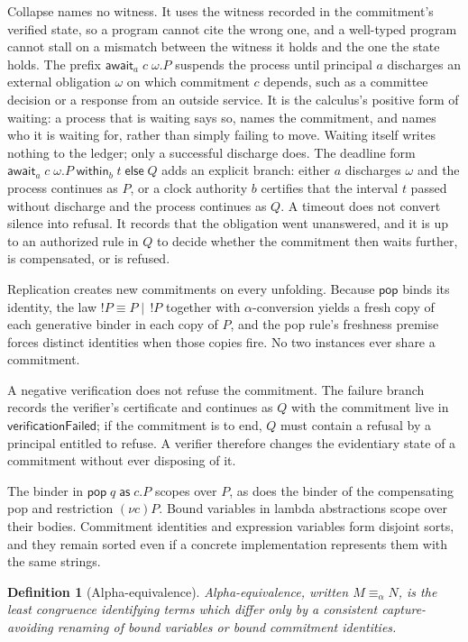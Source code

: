 \documentclass[11pt,openany]{book}
\newtheorem{definition}[theorem]{Definition}
\theoremstyle{remark}
\begin{document}
Collapse names no witness. It uses the witness recorded in the
commitment's verified state, so a program cannot cite the wrong one, and a
well-typed program cannot stall on a mismatch between the witness it holds
and the one the state holds. The prefix $\mathsf{await}_a\;c\;\omega.P$
suspends the process until principal $a$ discharges an external
obligation $\omega$ on which commitment $c$ depends, such as a committee
decision or a response from an outside service. It is the calculus's
positive form of waiting: a process that is waiting says so, names the
commitment, and names who it is waiting for, rather than simply failing to
move. Waiting itself writes nothing to the ledger; only a successful
discharge does. The deadline form
$\mathsf{await}_a\;c\;\omega.P\;\mathsf{within}_b\;t\;\mathsf{else}\;Q$
adds an explicit branch: either $a$ discharges $\omega$ and the process
continues as $P$, or a clock authority $b$ certifies that the interval $t$
passed without discharge and the process continues as $Q$. A timeout does
not convert silence into refusal. It records that the obligation went
unanswered, and it is up to an authorized rule in $Q$ to decide whether
the commitment then waits further, is compensated, or is refused.

Replication creates new commitments on every unfolding. Because
$\mathsf{pop}$ binds its identity, the law $!P\equiv P\mid\,!P$ together
with $\alpha$-conversion yields a fresh copy of each generative binder in
each copy of $P$, and the pop rule's freshness premise forces distinct
identities when those copies fire. No two instances ever share a
commitment.

A negative verification does not refuse the commitment. The failure
branch records the verifier's certificate and continues as $Q$ with the
commitment live in $\mathsf{verificationFailed}$; if the commitment is to
end, $Q$ must contain a refusal by a principal entitled to refuse. A
verifier therefore changes the evidentiary state of a commitment without
ever disposing of it.

The binder in $\mathsf{pop}\;q\;\mathsf{as}\;c.P$ scopes over $P$, as does
the binder of the compensating pop and restriction $(\nu c)P$. Bound
variables in lambda abstractions scope over their bodies. Commitment
identities and expression variables form disjoint sorts, and they remain
sorted even if a concrete implementation represents them with the same
strings.

\begin{definition}[Alpha-equivalence]
Alpha-equivalence, written $M\equiv_\alpha N$, is the least congruence
identifying terms which differ only by a consistent capture-avoiding
renaming of bound variables or bound commitment identities.
\end{definition}
\end{document}
